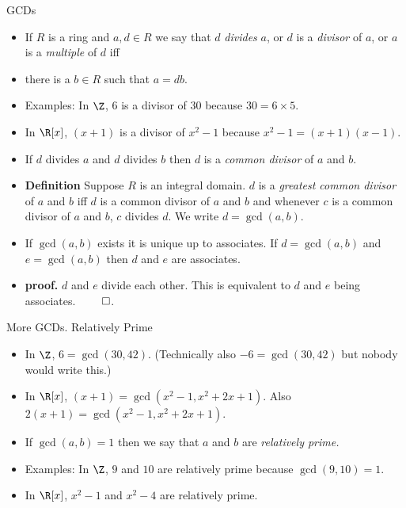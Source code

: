 \documentclass[handout]{beamer}
\begin{document}
\begin{frame}{GCDs}

\begin{itemize}
  \item If $R$ is a ring and $a,d\in R$ we say that $d$ \emph{divides} $a$, or $d$ is a \emph{divisor} of $a$, or $a$ is a \emph{multiple} of $d$ iff
  \item there is a $b\in R$ such that $a=db$.
  \item Examples: In $\Z$, $6$ is a divisor of $30$ because $30 = 6\times 5$.
  \item In $\R[x]$, $(x+1)$ is a divisor of $x^2-1$ because $x^2-1 = (x+1)(x-1)$.
  \item If $d$ divides $a$ and $d$ divides $b$ then $d$ is a \emph{common divisor} of $a$ and $b$.
  \item \textbf{Definition} Suppose $R$ is an integral domain. $d$ is a \emph{greatest common divisor} of $a$ and $b$ iff $d$ is a
  common divisor of $a$ and $b$ and whenever $c$ is a common divisor of $a$ and $b$, $c$ divides $d$.
  We write $d=\gcd(a,b)$.
  \item If $\gcd(a,b)$ exists it is unique up to associates. If $d=\gcd(a,b)$ and $e=\gcd(a,b)$ then $d$ and $e$ are associates.
  \item \textbf{proof.} $d$ and $e$ divide each other. This is equivalent to $d$ and $e$ being associates. $\qed$.
\end{itemize}

\end{frame}


\begin{frame}{More GCDs. Relatively Prime}

\begin{itemize}
  \item In $\Z$, $6 = \gcd(30, 42)$. (Technically also $-6=\gcd(30,42)$ but nobody would write this.)
  \item In $\R[x]$, $(x+1) = \gcd(x^2-1, x^2+2x+1)$. Also $2(x+1)= \gcd(x^2-1, x^2+2x+1)$.
  \item If $\gcd(a,b) = 1$ then we say that $a$ and $b$ are \emph{relatively prime.}
  \item Examples: In $\Z$, $9$ and $10$ are relatively prime because $\gcd(9,10) = 1$.
  \item In $\R[x]$, $x^2-1$ and $x^2 -4$ are relatively prime.
\end{itemize}

\end{frame}
\end{document}

